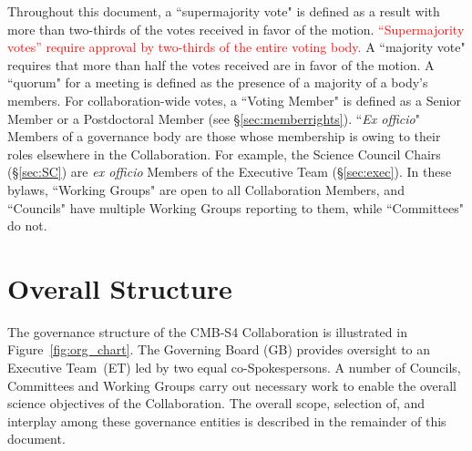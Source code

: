 \documentclass[12pt]{article}
\newcommand{\exec}{{Executive Team}}
\begin{document}
Throughout this document,  a ``supermajority vote" is defined as a result with more than two-thirds of the votes received in favor of  the motion. \textcolor{red}{``Supermajority votes'' require approval by two-thirds of the entire voting body.} A ``majority vote" requires that more than half the votes received are in favor of the motion.   A ``quorum" for a meeting is defined as the presence of a majority of a body's members.   For collaboration-wide votes, a ``Voting Member" is  defined as a Senior Member or a Postdoctoral Member (see \S\ref{sec:memberrights}). ``{\it Ex officio}" Members of a governance body are those whose membership is owing to their roles elsewhere in the Collaboration.  For example, the Science Council Chairs (\S\ref{sec:SC}) are {\it ex officio} Members of the Executive Team (\S\ref{sec:exec}).  In these bylaws,  ``Working Groups" are open to all Collaboration Members, and ``Councils" have multiple Working Groups reporting to them, while ``Committees" do not.  





\section{Overall Structure}
The governance structure of the CMB-S4 Collaboration  is illustrated in Figure~\ref{fig:org_chart}.  The Governing Board (GB) provides oversight to an \exec\ (ET) led by two equal co-Spokespersons.  A number of Councils, Committees and Working Groups carry out necessary work to enable the overall science objectives of the Collaboration. The overall scope, selection of, and interplay among these governance entities is described in the remainder of this document. 
\end{document}
